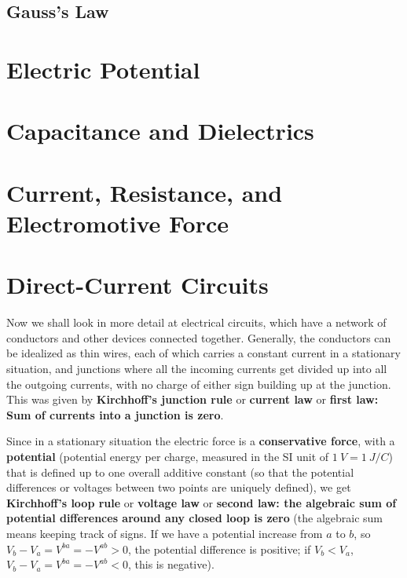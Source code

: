\documentclass[11pt, letterpaper, titlepage]{report}
\title{\textbf{\Huge{ \begin{center}
Physics 230 Notes\\ %
\end{center} }}}
\author{ Lora Ma and Benjamin Kong\\}
\begin{document}
\maketitle

\maketitle %
{
  \hypersetup{}
  \parskip 0pt
  \tableofcontents
} %
\newpage
{}
\pagestyle{mypagestyle}



\section{Gauss's Law}



\chapter{Electric Potential}
\chapter{Capacitance and Dielectrics}
\chapter{Current, Resistance, and Electromotive Force}
\chapter{Direct-Current Circuits}
Now we shall look in more detail at electrical circuits, which have a network of conductors and other devices connected together. Generally, the conductors can be idealized as thin wires, each of which carries a constant current in a stationary situation, and junctions where all the incoming currents get divided up into all the outgoing currents, with no charge of either sign building up at the junction. This was given by \textbf{Kirchhoff's junction rule} or \textbf{current law} or \textbf{first law: Sum of currents into a junction is zero}.

Since in a stationary situation the electric force is a \textbf{conservative force}, with a \textbf{potential} (potential energy per charge, measured in the SI unit of $\SI{1}{V} = \SI{1}{J/C}$) that is defined up to one overall additive constant (so that the potential differences or voltages between two points are uniquely defined), we get \textbf{Kirchhoff's loop rule} or \textbf{voltage law} or \textbf{second law: the algebraic sum of potential differences around any closed loop is zero} (the algebraic sum means keeping track of signs. If we have a potential increase from $a$ to $b$, so $V_b - V_a = V^{ba} = -V^{ab} > 0$, the potential difference is positive; if $V_b < V_a$, $V_b - V_a = V^{ba} = -V^{ab} < 0$, this is negative).
\end{document}
